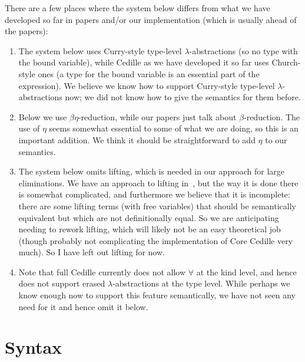 \documentclass{article}
\begin{document}
There are a few places where the system below differs from what we
have developed so far in papers and/or our implementation (which is
usually ahead of the papers):

\begin{enumerate}
  \item The system below uses Curry-style type-level
    $\lambda$-abstractions (so no type with the bound variable), while
    Cedille as we have developed it so far uses Church-style ones (a
    type for the bound variable is an essential part of the
    expression).  We believe we know how to support Curry-style
    type-level $\lambda$-abstractions now; we did not know how to
    give the semantics for them before.  

  \item Below we use $\beta\eta$-reduction, while our papers
    just talk about $\beta$-reduction.  The use of $\eta$ seems
    somewhat essential to some of what we are doing, so this is an
    important addition.  We think it should be straightforward to
    add $\eta$ to our semantics.

  \item The system below omits lifting, which is needed in our
    approach for large eliminations.  We have an approach to lifting
    in~\cite{stump17a}, but the way it is done there is somewhat
    complicated, and furthermore we believe that it is incomplete: there
    are some lifting terms (with free variables) that should be semantically
    equivalent but which are not definitionally equal.  So we are
    anticipating needing to rework lifting, which will likely not be
    an easy theoretical job (though probably not complicating the implementation
    of Core Cedille very much).  So I have left out lifting for now.

  \item Note that full Cedille currently does not allow $\forall$ at the kind level,
    and hence does not support erased $\lambda$-abstractions at the type level.  While
    perhaps we know enough now to support this feature semantically, we have not
    seen any need for it and hence omit it below.

    \end{enumerate}

\section{Syntax}
\end{document}
